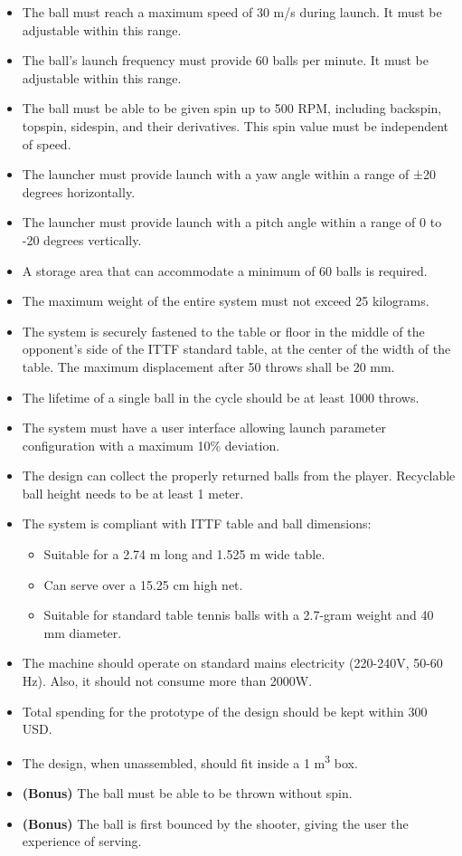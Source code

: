 \documentclass[12pt]{report}
\begin{document}
\begin{itemize}
    \item The ball must reach a maximum speed of 30 m/s during launch. It must be adjustable within this range.
    \item The ball’s launch frequency must provide 60 balls per minute. It must be adjustable within this range.
    \item The ball must be able to be given spin up to 500 RPM, including backspin, topspin, sidespin, and their derivatives. This spin value must be independent of speed.
    \item The launcher must provide launch with a yaw angle within a range of ±20 degrees horizontally.
    \item The launcher must provide launch with a pitch angle within a range of 0 to -20 degrees vertically.
    \item A storage area that can accommodate a minimum of 60 balls is required.
    \item The maximum weight of the entire system must not exceed 25 kilograms.
    \item The system is securely fastened to the table or floor in the middle of the opponent’s side of the ITTF standard table, at the center of the width of the table. The maximum displacement after 50 throws shall be 20 mm.
    \item The lifetime of a single ball in the cycle should be at least 1000 throws.
    \item The system must have a user interface allowing launch parameter configuration with a maximum 10\% deviation.
    \item The design can collect the properly returned balls from the player. Recyclable ball height needs to be at least 1 meter.
    \item The system is compliant with ITTF table and ball dimensions:
    \begin{itemize}
        \item Suitable for a 2.74 m long and 1.525 m wide table.
        \item Can serve over a 15.25 cm high net.
        \item Suitable for standard table tennis balls with a 2.7-gram weight and 40 mm diameter.
    \end{itemize}
    \item The machine should operate on standard mains electricity (220-240V, 50-60 Hz). Also, it should not consume more than 2000W.
    \item Total spending for the prototype of the design should be kept within 300 USD.
    \item The design, when unassembled, should fit inside a 1 m\textsuperscript{3} box.
    \item \textbf{(Bonus)} The ball must be able to be thrown without spin.
    \item \textbf{(Bonus)} The ball is first bounced by the shooter, giving the user the experience of serving.
\end{itemize}
\end{document}
